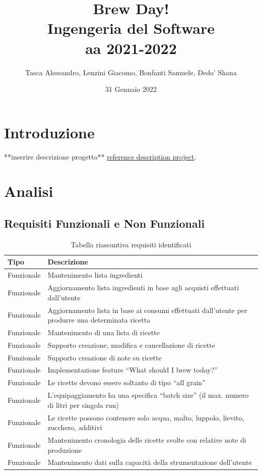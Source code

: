 \documentclass[12pt]{article}
\title{
  Brew Day! \\ 
  \large Ingengeria del Software \\
    aa 2021-2022}
\author{Tasca Alessandro, Lenzini Giacomo, Bonfanti Samuele, Dedo' Shana}
\date{31 Gennaio 2022}
\begin{document}
\maketitle
\newpage


\tableofcontents
\newpage


\section{Introduzione}
**inserire descrizione progetto**
\newline
 \href{http://score-contest.org/2018/projects/brewday.php}{reference description project}.


\newpage
\section{Analisi}

\subsection{Requisiti Funzionali e Non Funzionali}

\begin{table}[H]
\centering
\begin{tabular}{l|p{10cm}}
Tipo & Descrizione \\
\hline\hline
Funzionale & Mantenimento lista ingredienti \\\hline
Funzionale & Aggiornamento lista ingredienti in base agli acquisti effettuati dall’utente \\\hline
Funzionale & Aggiornamento lista in base ai consumi effettuati dall’utente per produrre una determinata ricetta \\\hline
Funzionale & Mantenimento di una lista di ricette \\\hline
Funzionale & Supporto creazione, modifica e cancellazione di ricette \\\hline
Funzionale & Supporto creazione di note su ricette \\\hline
Funzionale & Implementazione feature “What should I brew today?” \\\hline
Funzionale & Le ricette devono essere soltanto di tipo “all grain” \\\hline
Funzionale & L’equipaggiamento ha una specifica “batch size” (il max. numero di litri per singola run) \\\hline
Funzionale & Le ricette possono contenere solo acqua, malto, luppolo, lievito, zucchero, additivi\\ \hline
Funzionale & Mantenimento cronologia delle ricette svolte con relative note di produzione \\\hline
Funzionale & Mantenimento dati sulla capacità della strumentazione dell’utente \\
\end{tabular}
\caption{\label{tab:widgets}Tabella riassuntiva requisiti identificati}
\end{table}
\end{document}
